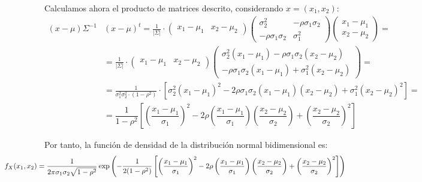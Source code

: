 Calculamos ahora el producto de matrices descrito, considerando $x=(x_1,x_2)$:
\begin{align*}
    (x-\mu)\Sigma^{-1}&(x-\mu)^t=\frac{1}{|\Sigma|}\cdot \begin{pmatrix}
        x_1-\mu_1 & x_2-\mu_2
    \end{pmatrix}\begin{pmatrix}
        \sigma_2^2 & -\rho\sigma_1\sigma_2\\
        -\rho\sigma_1\sigma_2 & \sigma_1^2
    \end{pmatrix}\begin{pmatrix}
        x_1-\mu_1\\
        x_2-\mu_2
    \end{pmatrix}
    =\\&= \frac{1}{|\Sigma|}\cdot 
    \begin{pmatrix}
        x_1-\mu_1 & x_2-\mu_2
    \end{pmatrix}\begin{pmatrix}
        \sigma_2^2(x_1-\mu_1)-\rho\sigma_1\sigma_2(x_2-\mu_2)\\
        -\rho\sigma_1\sigma_2(x_1-\mu_1)+\sigma_1^2(x_2-\mu_2)
    \end{pmatrix}
    =\\&=\frac{1}{\sigma_1^2\sigma_2^2\cdot (1-\rho^2)}\cdot \left[
    \sigma_2^2(x_1-\mu_1)^2-2\rho\sigma_1\sigma_2(x_1-\mu_1)(x_2-\mu_2)+\sigma_1^2(x_2-\mu_2)^2
    \right]
    = \\&= \dfrac{1}{1-\rho^2}\left[\left(\dfrac{x_1-\mu_1}{\sigma_1}\right)^2-2\rho\left(\dfrac{x_1-\mu_1}{\sigma_1}\right)\left(\dfrac{x_2-\mu_2}{\sigma_2}\right)+\left(\dfrac{x_2-\mu_2}{\sigma_2}\right)^2\right]
\end{align*}

Por tanto, la función de densidad de la distribución normal bidimensional es:
\begin{equation*}
    \hspace{-2cm}
    f_X(x_1,x_2)=\dfrac{1}{2\pi \sigma_1\sigma_2\sqrt{1-\rho^2}}\exp{\left(-\frac{1}{2(1-\rho^2)}\left[\left(\frac{x_1-\mu_1}{\sigma_1}\right)^2-2\rho\left(\frac{x_1-\mu_1}{\sigma_1}\right)\left(\frac{x_2-\mu_2}{\sigma_2}\right)+\left(\frac{x_2-\mu_2}{\sigma_2}\right)^2\right]\right)}
\end{equation*}


